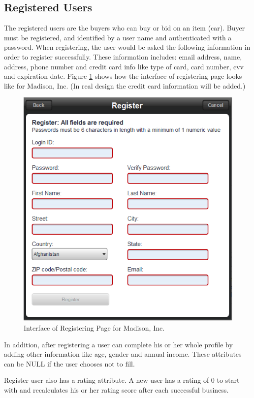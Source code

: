 \documentclass[12pt]{article}
\begin{document}
\subsection{Registered Users}
The registered users are the buyers who can buy or bid on an item (car). Buyer must be registered, and identified by a user name and authenticated with a password. When registering, the user would be asked the following information in order to register successfully. These information includes: email address, name, address, phone number and credit card info like type of card, card number, cvv and expiration date. Figure \ref{registered_users} shows how the interface of registering page looks like for Madison, Inc. (In real design the credit card information will be added.)
\begin{figure}[!h]
\caption{Interface of Registering Page for Madison, Inc.} \label{registered_users}
\begin{center}
\includegraphics[width=13cm]{registered_users}
\end{center}
\end{figure}
\par In addition, after registering a user can complete his or her whole profile by adding other information like age, gender and annual income. These attributes can be NULL if the user chooses not to fill.\par
Register user also has a rating attribute. A new user has a rating of 0 to start with and recalculates his or her rating score after each successful business.
\end{document}
